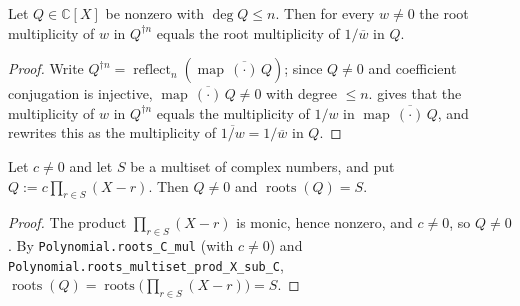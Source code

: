\begin{lemma}
    \label{lem:fr-complementary-mult}
    \leanok
    Let $Q \in \mathbb{C}[X]$ be nonzero with $\deg Q \le n$. Then for every
    $w \neq 0$ the root multiplicity of $w$ in $Q^{\dagger n}$ equals the root
    multiplicity of $1/\overline{w}$ in $Q$.
\end{lemma}
\begin{proof}
    Write $Q^{\dagger n} = \operatorname{reflect}_n(\operatorname{map}\,
    \overline{(\cdot)}\,Q)$; since $Q \neq 0$ and coefficient conjugation is
    injective, $\operatorname{map}\,\overline{(\cdot)}\,Q \neq 0$ with degree
    $\le n$.  gives that the multiplicity of $w$ in
    $Q^{\dagger n}$ equals the multiplicity of $1/w$ in
    $\operatorname{map}\,\overline{(\cdot)}\,Q$, and 
    rewrites this as the multiplicity of $\overline{1/w} = 1/\overline{w}$ in $Q$.
\end{proof}

\begin{lemma}
    \label{lem:fr-roots-scaled-prod}
    \leanok
    Let $c \neq 0$ and let $S$ be a multiset of complex numbers, and put
    $Q := c\prod_{r \in S}(X - r)$. Then $Q \neq 0$ and
    $\operatorname{roots}(Q) = S$.
\end{lemma}
\begin{proof}
    The product $\prod_{r\in S}(X - r)$ is monic, hence nonzero, and $c \neq 0$,
    so $Q \neq 0$. By \texttt{Polynomial.roots\_C\_mul} (with $c \neq 0$) and
    \texttt{Polynomial.roots\_multiset\_prod\_X\_sub\_C},
    $\operatorname{roots}(Q) = \operatorname{roots}\bigl(\prod_{r\in S}(X-r)\bigr)
    = S$.
\end{proof}

